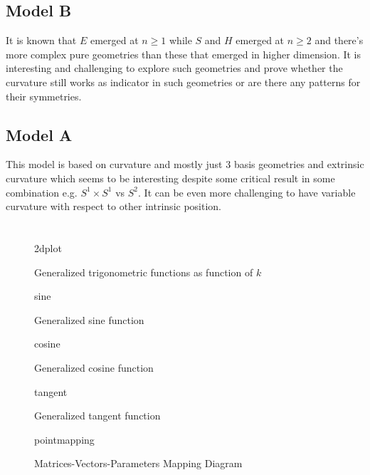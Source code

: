 \documentclass[stu, babel, american, biblatex, a4paper, draftall]{apa7}
\newcommand{\insertstandalone}[2]{{#2}}
\newcommand{\insertstandalone}[2]{\texttt{[image: \#1/\#2.pdf]}}
\begin{document}
\subsection{Model B}
It is known that $E$ emerged at $n\ge1$ while $S$ and $H$ emerged at $n\ge2$ and there's more complex pure geometries than these that emerged in higher dimension. It is interesting and challenging to explore such geometries and prove whether the curvature still works as indicator in such geometries or are there any patterns for their symmetries.
\subsection{Model A}
This model is based on curvature and mostly just 3 basis geometries and extrinsic curvature which seems to be interesting despite some critical result in some combination e.g. $S^1 \times S^1$ vs $S^2$. It can be even more challenging to have variable curvature with respect to other intrinsic position.
\section*{}
\printbibliography
\begin{figure}
    \centering
    \insertstandalone{figures}{2dplot}
    \caption{Generalized trigonometric functions as function of $k$}\label{TrigonometryPlotted}
\end{figure}
\begin{figure}
    \centering
    \insertstandalone{figures}{sine}
    \caption{Generalized sine function}\label{TrigonometrySinePlotted}
\end{figure}
\begin{figure}
    \centering
    \insertstandalone{figures}{cosine}
    \caption{Generalized cosine function}\label{TrigonometryCosinePlotted}
\end{figure}
\begin{figure}
    \centering
    \insertstandalone{figures}{tangent}
    \caption{Generalized tangent function}\label{TrigonometryTangentPlotted}
\end{figure}
\begin{figure}
    \centering
    \insertstandalone{figures}{pointmapping}
    \caption{Matrices-Vectors-Parameters Mapping Diagram}\label{PointMappingDiagram}
\end{figure}
\end{document}
